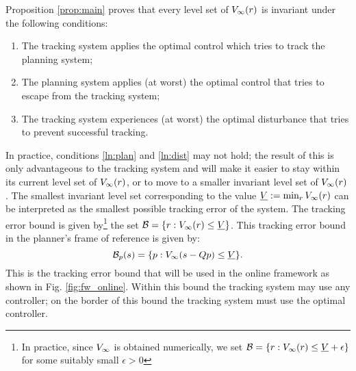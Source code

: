 Proposition \ref{prop:main} proves that every level set of $V_\infty(r)$ is invariant under the following conditions:
\begin{enumerate}
  \item The tracking system applies the optimal control which tries to track the planning system;
  \item The planning system applies (at worst) the optimal control that tries to escape from the tracking system; \label{ln:plan}
  \item The tracking system experiences (at worst) the optimal disturbance that tries to prevent successful tracking. \label{ln:dist}
\end{enumerate}
In practice, conditions \ref{ln:plan} and \ref{ln:dist} may not hold; the result of this is only advantageous to the tracking system and will make it easier to stay within its current level set of $V_\infty(r)$, or to move to a smaller invariant level set of $V_\infty(r)$. The smallest invariant level set corresponding to the value $\underline{V} := \min_{r} V_\infty(r)$ can be interpreted as the smallest possible tracking error of the system. The tracking error bound is given by\footnote{In practice, since $V_\infty$ is obtained numerically, we set $\mathcal B = \{r: V_\infty(r) \le \underline{V} + \epsilon\}$ for some suitably small $\epsilon>0$} the set $\mathcal B = \{r: V_\infty(r) \le \underline{V}\}$. This tracking error bound in the planner's frame of reference is given by:
\begin{equation} \label{eq:TEBp}
\mathcal B_p(s) = \{p: V_\infty(s-Qp) \le \underline{V}\}.
\end{equation}
This is the tracking error bound that will be used in the online framework as shown in Fig. \ref{fig:fw_online}. Within this bound the tracking system may use any controller; on the border of this bound the tracking system must use the optimal controller. 

